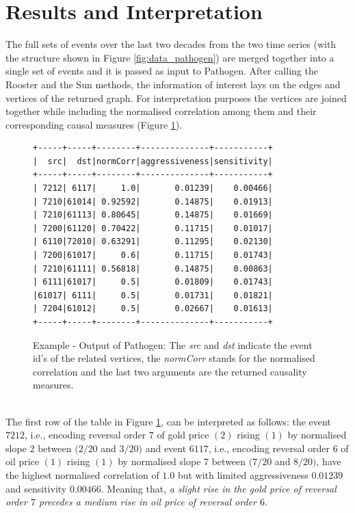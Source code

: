 \documentclass[a4, 11pt]{article}
\begin{document}
\section{Results and Interpretation}
The full sets of events over the last two decades from the two time series (with the structure shown in Figure \ref{fig:data_pathogen}) are merged together into a single set of events and it is passed as input to Pathogen. After calling the Rooster and the Sun methods, the information of interest lays on the edges and vertices of the returned graph. For interpretation purposes the vertices are joined together while including the normalised correlation among them and their corresponding causal measures (Figure \ref{fig:graph}).
\begin{figure}[!ht]
\centering
    \begin{BVerbatim}[baselinestretch=0.1,fontsize=\fontsize{12}{0}\selectfont]
+-----+-----+--------+--------------+-----------+
|  src|  dst|normCorr|aggressiveness|sensitivity|
+-----+-----+--------+--------------+-----------+
| 7212| 6117|     1.0|       0.01239|    0.00466|
| 7210|61014| 0.92592|       0.14875|    0.01913|
| 7210|61113| 0.80645|       0.14875|    0.01669|
| 7200|61120| 0.70422|       0.11715|    0.01017|
| 6110|72010| 0.63291|       0.11295|    0.02130|
| 7200|61017|     0.6|       0.11715|    0.01743|
| 7210|61111| 0.56818|       0.14875|    0.00863|
| 6111|61017|     0.5|       0.01809|    0.01743|
|61017| 6111|     0.5|       0.01731|    0.01821|
| 7204|61012|     0.5|       0.02667|    0.01613|
+-----+-----+--------+--------------+-----------+
    \end{BVerbatim}
    \caption{Example - Output of Pathogen: The \textit{src} and \textit{dst} indicate the event id's of the related vertices, the \textit{normCorr} stands for the normalised correlation and the last two arguments are the returned causality measures.}
    \label{fig:graph}
\end{figure}
\\The first row of the table in Figure \ref{fig:graph},  can be interpreted as follows: the event $7212$, i.e., encoding reversal order $7$ of gold price $(2)$ rising $(1)$ by normalised slope $2$ between $(2/20$ and $3/20)$ and event $6117$, i.e., encoding reversal order $6$ of oil price $(1)$ rising $(1)$ by normalised slope $7$ between $(7/20$ and $8/20)$, have the highest normalised correlation of $1.0$ but with limited aggressiveness $0.01239$ and sensitivity $0.00466$. Meaning that, \textit{a slight rise in the gold price of reversal order $7$ precedes a medium rise in oil price of reversal order $6$.}\\[3ex]
\end{document}
